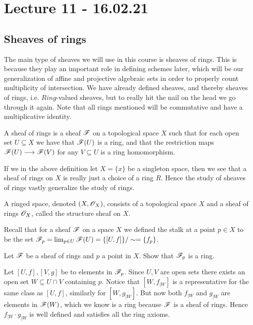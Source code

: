 

\section{Lecture 11 - 16.02.21}

\subsection{Sheaves of rings}

The main type of sheaves we will use in this course is sheaves of rings. This is because they play an important role in defining schemes later, which will be our generalization of affine and projective algebraic sets in order to properly count multiplicity of intersection. We have already defined sheaves, and thereby sheaves of rings, i.e. $Ring$-valued sheaves, but to really hit the nail on the head we go through it again. Note that all rings mentioned will be commutative and have a multiplicative identity. 

\begin{definition}
A sheaf of rings is a sheaf $\mathscr{F}$ on a topological space $X$ such that for each open set $U\subseteq X$ we have that $\mathscr{F}(U)$ is a ring, and that the restriction maps $\mathscr{F}(U)\longrightarrow \mathscr{F}(V)$ for any $V\subseteq U$ is a ring homomorphism. 
\end{definition}

If we in the above definition let $X=\{x\}$ be a singleton space, then we see that a sheaf of rings on $X$ is really just a choice of a ring $R$. Hence the study of sheaves of rings vastly generalize the study of rings. 

\begin{definition}
A ringed space, denoted $(X, \mathscr{O}_X)$, consists of a topological space $X$ and a sheaf of rings $\mathscr{O}_X$, called the structure sheaf on $X$. 
\end{definition}

Recall that for a sheaf $\mathscr{F}$ on a space $X$ we defined the stalk at a point $p\in X$ to be the set $\mathscr{F}_p = \lim_{p\in U}\mathscr{F}(U) = \{[U,f]\}/\sim = \{ f_p\}$. 
\begin{problem}
Let $\mathscr{F}$ be a sheaf of rings and $p$ a point in $X$. Show that $\mathscr{F}_p$ is a ring. 
\begin{solution}
Let $[U, f], [V, g]$ be to elements in $\mathscr{F}_p$. Since $U, V$ are open sets there exists an open set $W\subseteq U\cap V$ containing $p$. Notice that $[W, f_{\vert W}]$ is a representative for the same class as $[U, f]$, similarly for $[W, g_{\vert W}]$. But now both $f_{\vert W}$ and $g_{\vert W}$ are elements in $\mathscr{F}(W)$, which we know is a ring because $\mathscr{F}$ is a sheaf of rings. Hence $f_{\vert W}\cdot g_{\vert W}$ is well defined and satisfies all the ring axioms. 
\end{solution}
\end{problem}

